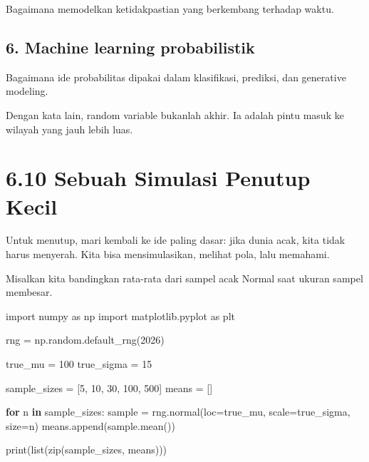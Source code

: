 \documentclass[
  letterpaper,
  DIV=11,
  numbers=noendperiod]{scrreprt}
\newenvironment{Shaded}{\begin{snugshade}}{\end{snugshade}}
\newcommand{\BuiltInTok}[1]{\textcolor[rgb]{0.00,0.23,0.31}{#1}}
\newcommand{\ControlFlowTok}[1]{\textcolor[rgb]{0.00,0.23,0.31}{\textbf{#1}}}
\newcommand{\DecValTok}[1]{\textcolor[rgb]{0.68,0.00,0.00}{#1}}
\newcommand{\ImportTok}[1]{\textcolor[rgb]{0.00,0.46,0.62}{#1}}
\newcommand{\KeywordTok}[1]{\textcolor[rgb]{0.00,0.23,0.31}{\textbf{#1}}}
\newcommand{\NormalTok}[1]{\textcolor[rgb]{0.00,0.23,0.31}{#1}}
\newcommand{\OperatorTok}[1]{\textcolor[rgb]{0.37,0.37,0.37}{#1}}
\begin{document}
Bagaimana memodelkan ketidakpastian yang berkembang terhadap waktu.

\subsection{6. Machine learning
probabilistik}\label{machine-learning-probabilistik}

Bagaimana ide probabilitas dipakai dalam klasifikasi, prediksi, dan
generative modeling.

Dengan kata lain, random variable bukanlah akhir. Ia adalah pintu masuk
ke wilayah yang jauh lebih luas.

\section{6.10 Sebuah Simulasi Penutup
Kecil}\label{sebuah-simulasi-penutup-kecil}

Untuk menutup, mari kembali ke ide paling dasar: jika dunia acak, kita
tidak harus menyerah. Kita bisa mensimulasikan, melihat pola, lalu
memahami.

Misalkan kita bandingkan rata-rata dari sampel acak Normal saat ukuran
sampel membesar.

\begin{Shaded}
\begin{Highlighting}[]
\ImportTok{import}\NormalTok{ numpy }\ImportTok{as}\NormalTok{ np}
\ImportTok{import}\NormalTok{ matplotlib.pyplot }\ImportTok{as}\NormalTok{ plt}

\NormalTok{rng }\OperatorTok{=}\NormalTok{ np.random.default\_rng(}\DecValTok{2026}\NormalTok{)}

\NormalTok{true\_mu }\OperatorTok{=} \DecValTok{100}
\NormalTok{true\_sigma }\OperatorTok{=} \DecValTok{15}

\NormalTok{sample\_sizes }\OperatorTok{=}\NormalTok{ [}\DecValTok{5}\NormalTok{, }\DecValTok{10}\NormalTok{, }\DecValTok{30}\NormalTok{, }\DecValTok{100}\NormalTok{, }\DecValTok{500}\NormalTok{]}
\NormalTok{means }\OperatorTok{=}\NormalTok{ []}

\ControlFlowTok{for}\NormalTok{ n }\KeywordTok{in}\NormalTok{ sample\_sizes:}
\NormalTok{    sample }\OperatorTok{=}\NormalTok{ rng.normal(loc}\OperatorTok{=}\NormalTok{true\_mu, scale}\OperatorTok{=}\NormalTok{true\_sigma, size}\OperatorTok{=}\NormalTok{n)}
\NormalTok{    means.append(sample.mean())}

\BuiltInTok{print}\NormalTok{(}\BuiltInTok{list}\NormalTok{(}\BuiltInTok{zip}\NormalTok{(sample\_sizes, means)))}
\end{Highlighting}
\end{Shaded}
\end{document}
